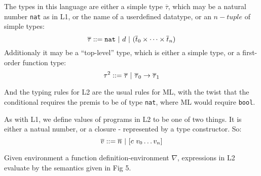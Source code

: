 The types in this language are either a simple type $\overline\tau$,
which may be a natural number {\tt nat} as in L1,
or the name of a userdefined datatype,
or an $n-tuple$ of simple types:
\[\overline \tau ::= \text{\tt nat}
                 \ |\  d
                 \ |\  (\overline t_0 \times \dots \times \overline t_n)
\]
Additionaly it may be a ``top-level'' type, which is either
a simple type, or a first-order function type:
\[\tau^2 ::= \overline \tau \ |\  \overline \tau_0 \rightarrow \overline \tau_1 \]

And the typing rules for L2 are the usual rules for ML, with the twist
that the conditional requires the premis to be of type {\tt nat},
where ML would require {\tt bool}.

As with L1, we define values of programs in L2 to be one of two things.
It is either a natual number, or a closure - represented by a type constructor.
So:
\[ \overline v ::= \overline n \ |\  [c\ v_0 \dots v_n]\]

Given environment a function definition-environment $\nabla$,
expressions in L2 evaluate by the semantics given in Fig 5.
\def\EVAL{\downarrow}

